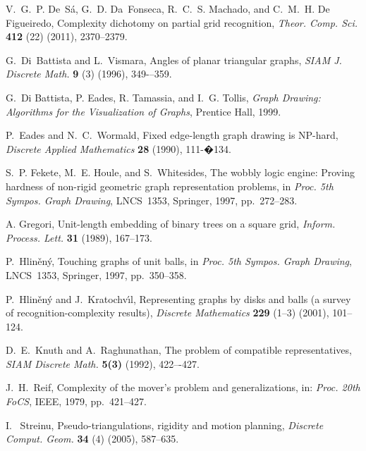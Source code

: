 \documentclass{llncs}
\begin{document}
\begin{thebibliography}{99}
V.~G.~P. De~S\'a, G.~D. Da~Fonseca, R.~C.~S. Machado, and C.~M.~H. De Figueiredo,
Complexity dichotomy on partial grid recognition,
\emph{Theor. Comp. Sci.} {\bf 412} (22) (2011), 2370--2379.

G.~Di~Battista and L.~Vismara, Angles of planar triangular graphs,
\emph{SIAM J. Discrete Math.} {\bf 9} (3) (1996), 349-–359.

G.~Di Battista, P. Eades, R. Tamassia, and I.~G. Tollis,
\emph{Graph Drawing: Algorithms for the Visualization of Graphs},
Prentice Hall, 1999.

P.~Eades and N.~C.~Wormald, Fixed edge-length graph drawing is NP-hard,
\emph{Discrete Applied Mathematics} {\bf 28} (1990), 111-�134.

S.~P. Fekete, M.~E. Houle, and S.~Whitesides,
The wobbly logic engine: Proving hardness of non-rigid geometric graph representation problems,
in \emph{Proc. 5th Sympos. Graph Drawing}, LNCS~1353, Springer, 1997, pp.~272--283.

A. Gregori,
Unit-length embedding of binary trees on a square grid,
\emph{Inform. Process. Lett.} {\bf 31} (1989), 167--173.

P.~Hlin\v{e}n\'y,
Touching graphs of unit balls,
in \emph{Proc. 5th Sympos. Graph Drawing}, LNCS~1353, Springer, 1997, pp.~350--358.

P.~Hlin\v{e}n\'y and J.~Kratochv\'{\i}l,
Representing graphs by disks and balls (a survey of recognition-complexity results),
\emph{Discrete Mathematics} {\bf 229} (1–3) (2001), 101--124.

D.~E.~Knuth and A.~Raghunathan,
The problem of compatible representatives,
\emph{SIAM Discrete Math.} {\bf 5(3)} (1992), 422–-427.



J.~H.~Reif,
Complexity of the mover’s problem and generalizations,
in: \emph{Proc. 20th FoCS}, IEEE, 1979, pp.~421--427.

I.~ Streinu,
Pseudo-triangulations, rigidity and motion planning,
\emph{Discrete Comput. Geom.} {\bf 34} (4) (2005), 587--635.

\end{thebibliography}
\end{document}
